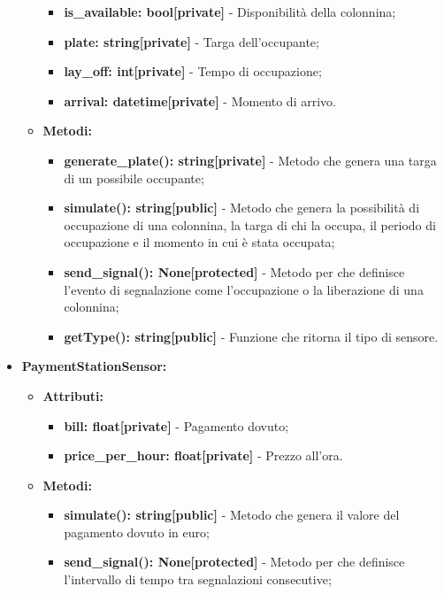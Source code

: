 \documentclass[8pt]{article}
\begin{document}
\begin{itemize}
\begin{itemize}
        \begin{itemize}
	\setlength\itemsep{0em}
            \item \textbf{is\_available: bool[private]} - Disponibilità della colonnina;
            \item \textbf{plate: string[private]} - Targa dell'occupante;
            \item \textbf{lay\_off: int[private]} - Tempo di occupazione;
            \item \textbf{arrival: datetime[private]} - Momento di arrivo.
        \end{itemize}
        \item \textbf{Metodi:}
        \begin{itemize}
	\setlength\itemsep{0em}
            \item \textbf{generate\_plate(): string[private]} - Metodo che genera una targa di un possibile occupante;
            \item \textbf{simulate(): string[public]} - Metodo che genera la possibilità di occupazione di una colonnina, la targa di chi la occupa, il periodo di occupazione e il momento in cui è stata occupata;
            \item \textbf{send\_signal(): None[protected]} - Metodo per che definisce l'evento di segnalazione come l'occupazione o la liberazione di una colonnina;
            \item \textbf{getType(): string[public]} - Funzione che ritorna il tipo di sensore.
        \end{itemize}
    \end{itemize}
    \item \textbf{PaymentStationSensor:}
    \begin{itemize}
	\setlength\itemsep{0em}
        \item \textbf{Attributi:}
        \begin{itemize}
	\setlength\itemsep{0em}
            \item \textbf{bill: float[private]} - Pagamento dovuto;
            \item \textbf{price\_per\_hour: float[private]} - Prezzo all'ora.
        \end{itemize}
        \item \textbf{Metodi:}
        \begin{itemize}
	\setlength\itemsep{0em}
            \item \textbf{simulate(): string[public]} - Metodo che genera il valore del pagamento dovuto in euro;
            \item \textbf{send\_signal(): None[protected]} - Metodo per che definisce l'intervallo di tempo tra segnalazioni consecutive;

\end{itemize}
\end{itemize}
\end{itemize}
\end{document}
